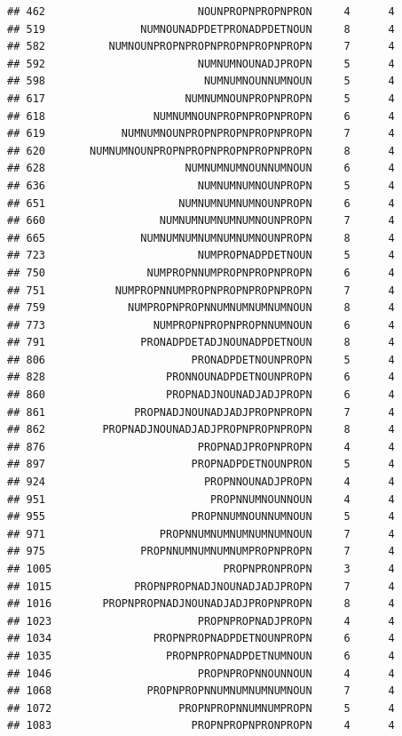\documentclass[]{article}
\begin{document}
\begin{verbatim}
## 462                        NOUNPROPNPROPNPRON     4      4
## 519               NUMNOUNADPDETPRONADPDETNOUN     8      4
## 582          NUMNOUNPROPNPROPNPROPNPROPNPROPN     7      4
## 592                        NUMNUMNOUNADJPROPN     5      4
## 598                         NUMNUMNOUNNUMNOUN     5      4
## 617                      NUMNUMNOUNPROPNPROPN     5      4
## 618                 NUMNUMNOUNPROPNPROPNPROPN     6      4
## 619            NUMNUMNOUNPROPNPROPNPROPNPROPN     7      4
## 620       NUMNUMNOUNPROPNPROPNPROPNPROPNPROPN     8      4
## 628                      NUMNUMNUMNOUNNUMNOUN     6      4
## 636                        NUMNUMNUMNOUNPROPN     5      4
## 651                     NUMNUMNUMNUMNOUNPROPN     6      4
## 660                  NUMNUMNUMNUMNUMNOUNPROPN     7      4
## 665               NUMNUMNUMNUMNUMNUMNOUNPROPN     8      4
## 723                        NUMPROPNADPDETNOUN     5      4
## 750                NUMPROPNNUMPROPNPROPNPROPN     6      4
## 751           NUMPROPNNUMPROPNPROPNPROPNPROPN     7      4
## 759             NUMPROPNPROPNNUMNUMNUMNUMNOUN     8      4
## 773                 NUMPROPNPROPNPROPNNUMNOUN     6      4
## 791               PRONADPDETADJNOUNADPDETNOUN     8      4
## 806                       PRONADPDETNOUNPROPN     5      4
## 828                   PRONNOUNADPDETNOUNPROPN     6      4
## 860                   PROPNADJNOUNADJADJPROPN     6      4
## 861              PROPNADJNOUNADJADJPROPNPROPN     7      4
## 862         PROPNADJNOUNADJADJPROPNPROPNPROPN     8      4
## 876                        PROPNADJPROPNPROPN     4      4
## 897                       PROPNADPDETNOUNPRON     5      4
## 924                         PROPNNOUNADJPROPN     4      4
## 951                          PROPNNUMNOUNNOUN     4      4
## 955                       PROPNNUMNOUNNUMNOUN     5      4
## 971                  PROPNNUMNUMNUMNUMNUMNOUN     7      4
## 975               PROPNNUMNUMNUMNUMPROPNPROPN     7      4
## 1005                           PROPNPRONPROPN     3      4
## 1015             PROPNPROPNADJNOUNADJADJPROPN     7      4
## 1016        PROPNPROPNADJNOUNADJADJPROPNPROPN     8      4
## 1023                       PROPNPROPNADJPROPN     4      4
## 1034                PROPNPROPNADPDETNOUNPROPN     6      4
## 1035                  PROPNPROPNADPDETNUMNOUN     6      4
## 1046                       PROPNPROPNNOUNNOUN     4      4
## 1068               PROPNPROPNNUMNUMNUMNUMNOUN     7      4
## 1072                    PROPNPROPNNUMNUMPROPN     5      4
## 1083                      PROPNPROPNPRONPROPN     4      4

\end{verbatim}
\end{document}
